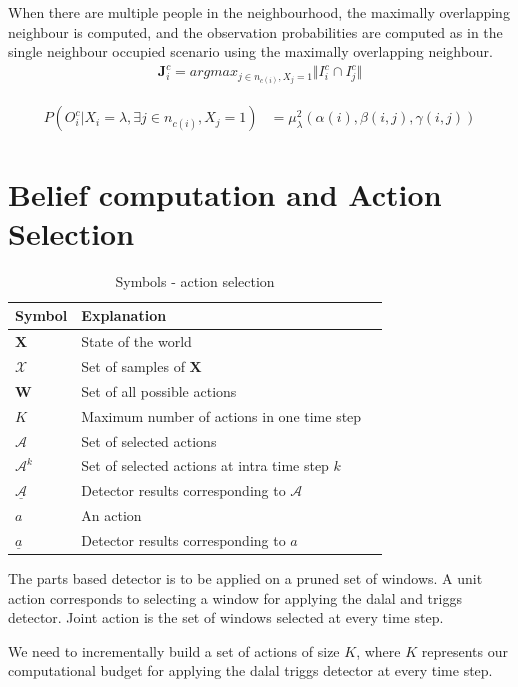 \documentclass[10pt,twocolumn,letterpaper]{article}
\begin{document}
When there are multiple people in the neighbourhood, the maximally overlapping neighbour is computed, and the observation probabilities are computed as in the single neighbour occupied scenario using the maximally overlapping neighbour. 
\begin{align}
 \textbf{J}_{i}^{c} = argmax_{j\in n_{c(i)},X_{j}=1} \Vert I_{i}^{c}\cap I_{j}^{c} \Vert  
\end{align}

\begin{align}
 P(O^{c}_{i} |X_{i}=\lambda ,\exists j  \in{n_{c(i)}},X_{j} =1)  &=\mu^{2}_{\lambda}(     \alpha(i),\beta(i,j),\gamma(i,j))
\end{align}

\section{Belief computation and Action Selection}

\begin{table}[ht]
  \begin{tabular}{lll}
   \hline
   Symbol & Explanation \\
   \hline
$\textbf{X} $ & State of the world\\
 $\mathcal{X} $ & Set of samples of $\textbf{X}$ \\
 $\textbf{W} $ & Set of all possible actions\\
 $K$ & Maximum number of actions in one time step\\
 $\mathcal{A} $ & Set of selected actions\\
 $\mathcal{A}^{k} $ & Set of selected actions at intra time step $k$\\
 $\underline{\mathcal{A}} $ & Detector results corresponding to $\mathcal{A}$\\
 $a $ & An action\\
 $ \underline{a} $ & Detector results corresponding to $ a$\\
   \hline
  \end{tabular}
  \caption{
    Symbols - action selection
  }
  \label{tab:Symbols in action selection}
\end{table}

The parts based detector is to be applied on a pruned set of windows. A unit action corresponds to selecting a window for applying the dalal and triggs detector. Joint action is the set of windows selected at every time step. 

We need to incrementally build a set of actions of size $ K $, where $ K $ represents our computational budget for applying the dalal triggs detector at every time step. 
\end{document}
